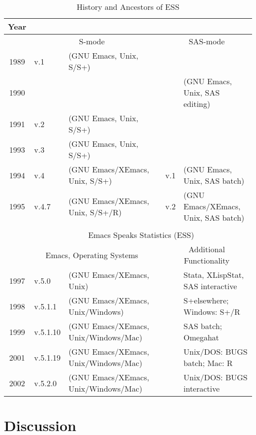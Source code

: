 \documentclass{article}
\begin{document}
\begin{table}[htbp]
  \centering
  {\scriptsize
  \begin{tabular}{c ll c ll}
\hline
    Year  \\
\hline
         & \multicolumn{2}{c}{S-mode}               && \multicolumn{2}{c}{SAS-mode} \\
\cline{2-3} \cline{5-6}
    1989 & v.1   & (GNU Emacs, Unix, S/S+)          &&  \\
    1990 &       &                                  &&     & (GNU Emacs, Unix, SAS editing) \\
    1991 & v.2   & (GNU Emacs, Unix, S/S+)          && \\
    1993 & v.3   & (GNU Emacs, Unix, S/S+)          && \\
    1994 & v.4   & (GNU Emacs/XEmacs, Unix, S/S+)   && v.1 & (GNU Emacs, Unix, SAS batch) \\
    1995 & v.4.7 & (GNU Emacs/XEmacs, Unix, S/S+/R) && v.2 & (GNU Emacs/XEmacs, Unix, SAS batch) \\
         &       &                                  &&     & \\ \cline{2-6}
         & \multicolumn{5}{c}{Emacs Speaks Statistics (ESS)} \\
    \cline{2-6}
         &\multicolumn{2}{c}{Emacs, Operating Systems}     &&\multicolumn{2}{c}{Additional Functionality}\\
\cline{2-3} \cline{5-6}
    1997 & v.5.0    & (GNU Emacs/XEmacs, Unix)             &&& Stata, XLispStat, SAS interactive \\
    1998 & v.5.1.1  & (GNU Emacs/XEmacs, Unix/Windows)     &&& S+elsewhere; Windows: S+/R\\
    1999 & v.5.1.10 & (GNU Emacs/XEmacs, Unix/Windows/Mac) &&& SAS batch; Omegahat \\
    2001 & v.5.1.19 & (GNU Emacs/XEmacs, Unix/Windows/Mac) &&& Unix/DOS: BUGS batch; Mac: R \\
    2002 & v.5.2.0  & (GNU Emacs/XEmacs, Unix/Windows/Mac) &&& Unix/DOS: BUGS interactive \\
    \hline
  \end{tabular}
  }
  \caption{History and Ancestors of ESS}
  \label{tab:timeline}
\end{table}

\section{Discussion}
\label{sec:concl}
\end{document}
